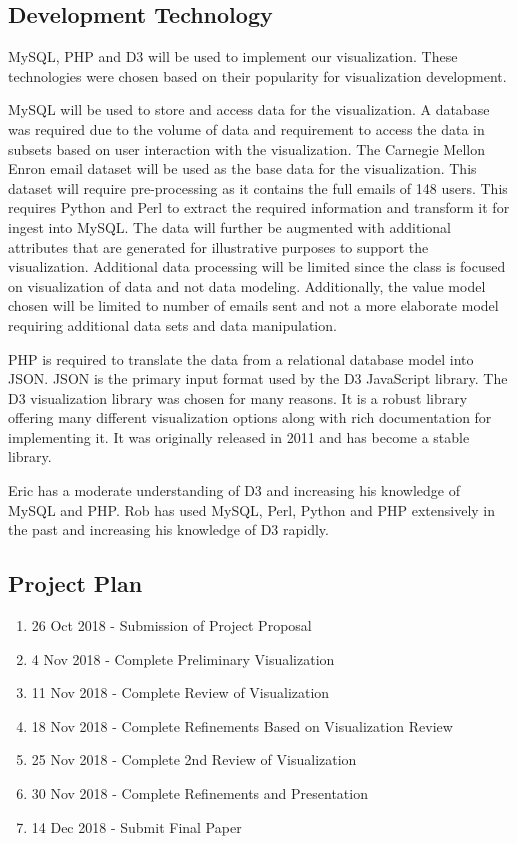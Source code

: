 \documentclass{soups}
\begin{document}
\subsection{Development Technology}
MySQL, PHP and D3 will be used to implement our visualization.  These technologies were chosen based on their popularity for visualization development.

MySQL will be used to store and access data for the visualization.  A database was required due to the volume of data and requirement to access the data in subsets based on user interaction with the visualization.  The Carnegie Mellon Enron email dataset\cite{cmuenron} will be used as the base data for the visualization.  This dataset will require pre-processing as it contains the full emails of 148 users.  This requires Python and Perl to extract the required information and transform it for ingest into MySQL.  The data will further be augmented with additional attributes that are generated for illustrative purposes to support the visualization.  Additional data processing will be limited since the class is focused on visualization of data and not data modeling.  Additionally, the value model chosen will be limited to number of emails sent and not a more elaborate model requiring additional data sets and data manipulation. 

PHP is required to translate the data from a relational database model into JSON.  JSON is the primary input format used by the D3 JavaScript library.  The D3 visualization library was chosen for many reasons.  It is a robust library offering many different visualization options along with rich documentation for implementing it.  It was originally released in 2011 and has become a stable library.

Eric has a moderate understanding of D3 and increasing his knowledge of MySQL and PHP.  Rob has used MySQL, Perl, Python and PHP extensively in the past and increasing his knowledge of D3 rapidly.

\subsection{Project Plan}
\begin{enumerate}
\item 26 Oct 2018 - Submission of Project Proposal
\item 4 Nov 2018 - Complete Preliminary Visualization
\item 11 Nov 2018 - Complete Review of Visualization
\item 18 Nov 2018 - Complete Refinements Based on Visualization Review
\item 25 Nov 2018 - Complete 2nd Review of Visualization
\item 30 Nov 2018 - Complete Refinements and Presentation
\item 14 Dec 2018 - Submit Final Paper
\end{enumerate}

\printbibliography
\end{document}
